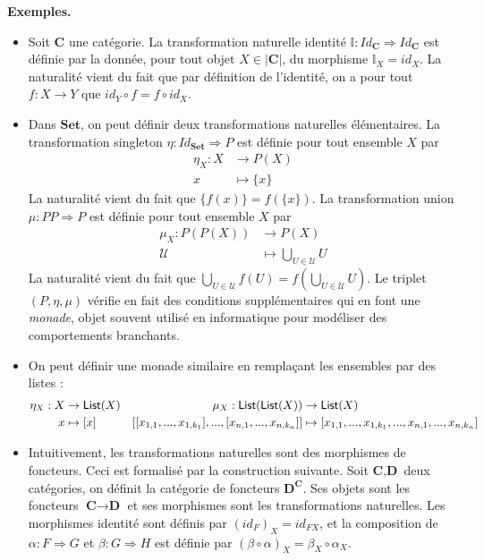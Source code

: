 \documentclass[11pt,a4paper]{report}
\newcommand{\gr}{\textbf}
\newcommand{\il}{\textit}
\newcommand{\U}{\mathcal{U}}
\newcommand{\info}[1]{\text{{\fontfamily{lmss}\selectfont #1}}}
\newcommand{\1}{\mathbbm{1}}
\begin{document}
\gr{Exemples.} \begin{itemize}
\item Soit $\gr{C}$ une catégorie. La transformation naturelle identité $\mathbb{I} : Id_\gr{C} \Rightarrow Id_\gr{C}$ est définie par la donnée, pour tout objet $X \in |\gr{C}|$, du morphisme $\mathbb{I}_X = id_X$. La naturalité vient du fait que par définition de l'identité, on a pour tout $f : X \to Y$ que $id_Y \circ f = f \circ id_X$.
\item Dans $\gr{Set}$, on peut définir deux transformations naturelles élémentaires. La transformation singleton $\eta : Id_\gr{Set} \Rightarrow P$ est définie pour tout ensemble $X$ par
\begin{align*}
\eta_X : X & \to P(X) \\
x & \mapsto \{ x \}
\end{align*}
La naturalité vient du fait que $\{ f(x) \} = f(\{x\})$. La transformation union $\mu : PP \Rightarrow P$ est définie pour tout ensemble $X$ par
\begin{align*}
\mu_X : P(P(X)) & \to P(X) \\
\U & \mapsto \bigcup_{U \in \U} U
\end{align*}
La naturalité vient du fait que $\bigcup_{U\in \U} f(U) = f\left(\bigcup_{U \in \U} U\right)$. Le triplet $(P,\eta,\mu)$ vérifie en fait des conditions supplémentaires qui en font une \il{monade}, objet souvent utilisé en informatique pour modéliser des comportements branchants.
\item On peut définir une monade similaire en remplaçant les ensembles par des listes :
\begin{align*}
 \eta_X : X & \to \info{List}(X) & \mu_X : \info{List}(\info{List}(X)) & \to \info{List}(X)  \\
 x & \mapsto [x] & [[x_{1,1},...,x_{1,k_1}],...,[x_{n,1},...,x_{n,k_n}]] & \mapsto [x_{1,1},...,x_{1,k_1},...,x_{n,1},...,x_{n,k_n}]
\end{align*}
\item Intuitivement, les transformations naturelles sont des morphismes de foncteurs. Ceci est formalisé par la construction suivante. Soit $\gr{C},\gr{D}$ deux catégories, on définit la catégorie de foncteurs $\gr{D}^\gr{C}$. Ses objets sont les foncteurs $\gr{C} \to \gr{D}$ et ses morphismes sont les transformations naturelles. Les morphismes identité sont définis par $(id_F)_X = id_{FX}$, et la composition de $\alpha : F \Rightarrow G$ et $\beta : G \Rightarrow H$ est définie par $(\beta \circ \alpha)_X = \beta_X \circ \alpha_X$.
\end{itemize}
\newpage
\end{document}

